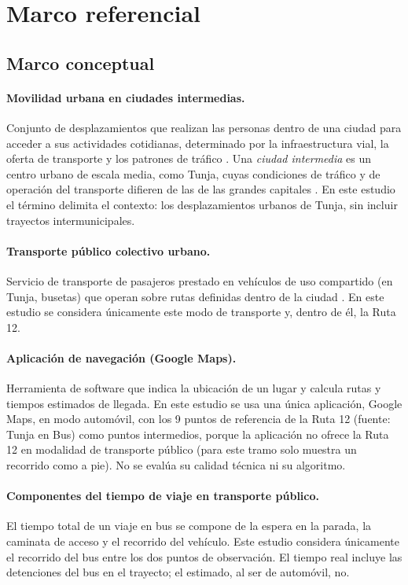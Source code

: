 \section{Marco referencial}

\subsection{Marco conceptual}

\paragraph{Movilidad urbana en ciudades intermedias.}
Conjunto de desplazamientos que realizan las personas dentro de una ciudad para acceder a sus actividades cotidianas, determinado por la infraestructura vial, la oferta de transporte y los patrones de tráfico \cite{salvatierra2023}. Una \emph{ciudad intermedia} es un centro urbano de escala media, como Tunja, cuyas condiciones de tráfico y de operación del transporte difieren de las de las grandes capitales \cite{pulido2024}. En este estudio el término delimita el contexto: los desplazamientos urbanos de Tunja, sin incluir trayectos intermunicipales.

\paragraph{Transporte público colectivo urbano.}
Servicio de transporte de pasajeros prestado en vehículos de uso compartido (en Tunja, busetas) que operan sobre rutas definidas dentro de la ciudad \cite{munoz2019, sanchez2012}. En este estudio se considera únicamente este modo de transporte y, dentro de él, la Ruta 12.

\paragraph{Aplicación de navegación (Google Maps).}
Herramienta de software que indica la ubicación de un lugar y calcula rutas y tiempos estimados de llegada. En este estudio se usa una única aplicación, Google Maps, en modo automóvil, con los 9 puntos de referencia de la Ruta 12 (fuente: Tunja en Bus) como puntos intermedios, porque la aplicación no ofrece la Ruta 12 en modalidad de transporte público (para este tramo solo muestra un recorrido como a pie). No se evalúa su calidad técnica ni su algoritmo.

\paragraph{Componentes del tiempo de viaje en transporte público.}
El tiempo total de un viaje en bus se compone de la espera en la parada, la caminata de acceso y el recorrido del vehículo. Este estudio considera únicamente el recorrido del bus entre los dos puntos de observación. El tiempo real incluye las detenciones del bus en el trayecto; el estimado, al ser de automóvil, no.

